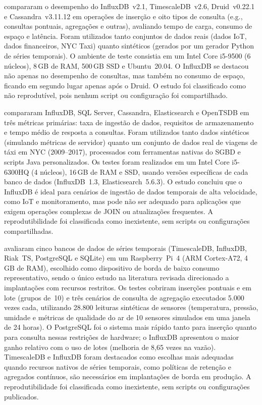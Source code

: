 \cite{shah2022performance} compararam o desempenho do InfluxDB~v2.1, TimescaleDB~v2.6,
Druid~v0.22.1 e Cassandra~v3.11.12 em operações de inserção e oito tipos de consulta
(e.g., consultas pontuais, agregações e outras), avaliando tempo de carga, consumo de espaço e
latência. Foram utilizados tanto conjuntos de dados reais (dados IoT, dados financeiros, NYC
Taxi) quanto sintéticos (gerados por um gerador Python de séries temporais). O ambiente de
teste consistia em um Intel Core i5-9500 (6 núcleos), 8\,GB de RAM, 500\,GB SSD e
Ubuntu~20.04. O InfluxDB se destacou não apenas no desempenho de consultas, mas também no
consumo de espaço, ficando em segundo lugar apenas após o Druid. O estudo foi classificado
como não reprodutível, pois nenhum script ou configuração foi compartilhado.

\cite{naqvi2017influxdb} compararam InfluxDB, SQL Server, Cassandra, Elasticsearch e OpenTSDB
em três métricas primárias: taxa de ingestão de dados, requisitos de armazenamento e tempo
médio de resposta a consultas. Foram utilizados tanto dados sintéticos (simulando métricas de
servidor) quanto um conjunto de dados real de viagens de táxi em NYC (2009--2017), processados
com ferramentas nativas do SGBD e scripts Java personalizados. Os testes foram realizados em
um Intel Core i5-6300HQ (4 núcleos), 16\,GB de RAM e SSD, usando versões específicas de cada
banco de dados (InfluxDB~1.3, Elasticsearch~5.6.3). O estudo concluiu que o InfluxDB é ideal
para cenários de ingestão de dados temporais de alta velocidade, como IoT e monitoramento, mas
pode não ser adequado para aplicações que exigem operações complexas de JOIN ou atualizações
frequentes. A reprodutibilidade foi classificada como inexistente, sem scripts ou configurações
compartilhadas.

\cite{grzesik2020comparative} avaliaram cinco bancos de dados de séries temporais (TimescaleDB,
InfluxDB, Riak~TS, PostgreSQL e SQLite) em um Raspberry~Pi~4 (ARM Cortex-A72, 4\,GB de RAM),
escolhido como dispositivo de borda de baixo consumo representativo, sendo o único estudo
na literatura revisada direcionado a implantações com recursos restritos. Os testes cobriram
inserções pontuais e em lote (grupos de~10) e três cenários de consulta de agregação executados
5.000 vezes cada, utilizando 28.800 leituras sintéticas de sensores (temperatura, pressão,
umidade e métricas de qualidade do ar de 10 sensores simulados em uma janela de 24 horas).
O PostgreSQL foi o sistema mais rápido tanto para inserção quanto para consulta nessas restrições
de hardware; o InfluxDB apresentou o maior ganho relativo com o uso de lotes (melhoria de
8,65 vezes na vazão). TimescaleDB e InfluxDB foram destacados como escolhas mais adequadas
quando recursos nativos de séries temporais, como políticas de retenção e agregados contínuos,
são necessários em implantações de borda em produção. A reprodutibilidade foi classificada
como inexistente, sem scripts ou configurações publicados.

